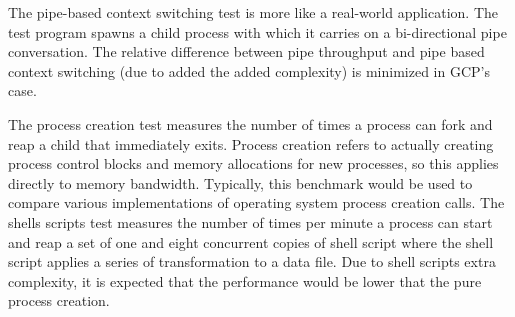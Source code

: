 \documentclass[11pt]{article}
\begin{document}
The pipe-based context switching test is more like a real-world application. The test program spawns a child process with which it carries on a bi-directional pipe conversation. The relative difference between pipe throughput and pipe based context switching (due to added the added complexity) is minimized in GCP's case.


\vspace{-5mm} The process creation test measures the number of times a process can fork and reap a child that immediately exits. Process creation refers to actually creating process control blocks and memory allocations for new processes, so this applies directly to memory bandwidth. Typically, this benchmark would be used to compare various implementations of operating system process creation calls. The shells scripts test measures the number of times per minute a process can start and reap a set of one and eight concurrent copies of shell script where the shell script applies a series of transformation to a data file. Due to shell scripts extra complexity, it is expected that the performance would be lower that the pure process creation. 
\end{document}
